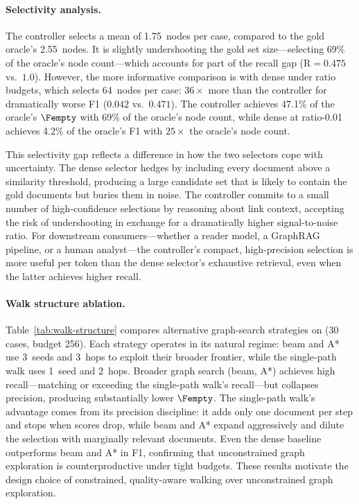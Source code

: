 \paragraph{Selectivity analysis.}
The controller selects a mean of 1.75~nodes per case, compared to the
gold oracle's 2.55~nodes.
It is slightly undershooting the gold set size---selecting 69\% of the
oracle's node count---which accounts for part of the recall gap
($\mathrm{R} = 0.475$ vs.\ $1.0$).
However, the more informative comparison is with dense under ratio
budgets, which selects 64~nodes per case: $36{\times}$ more than the
controller for dramatically worse F1 ($0.042$ vs.\ $0.471$).
The controller achieves 47.1\% of the oracle's $\Fempty$
with 69\% of the oracle's node count, while dense at ratio-0.01 achieves
4.2\% of the oracle's F1 with $25{\times}$ the oracle's node count.

This selectivity gap reflects a difference in how the two selectors
cope with uncertainty.
The dense selector hedges by including every document above a similarity
threshold, producing a large candidate set that is likely to contain the
gold documents but buries them in noise.
The controller commits to a small number of high-confidence selections by
reasoning about link context, accepting the risk of undershooting in
exchange for a dramatically higher signal-to-noise ratio.
For downstream consumers---whether a reader model, a GraphRAG
pipeline, or a human analyst---the controller's compact, high-precision
selection is more useful per token than the dense selector's
exhaustive retrieval, even when the latter achieves higher recall.

\paragraph{Walk structure ablation.}
Table~\ref{tab:walk-structure} compares alternative graph-search strategies
on \TwoWikiShort (30 cases, budget 256).
Each strategy operates in its natural regime: beam and A* use 3~seeds and
3~hops to exploit their broader frontier, while the single-path walk uses
1~seed and 2~hops.
Broader graph search (beam, A*) achieves high recall---matching or
exceeding the single-path walk's recall---but collapses precision,
producing substantially lower $\Fempty$.
The single-path walk's advantage comes from its precision discipline:
it adds only one document per step and stops when scores drop, while
beam and A* expand aggressively and dilute the selection with
marginally relevant documents.
Even the dense baseline outperforms beam and A* in F1, confirming that
unconstrained graph exploration is counterproductive under tight budgets.
These results motivate the design choice of constrained, quality-aware
walking over unconstrained graph exploration.

